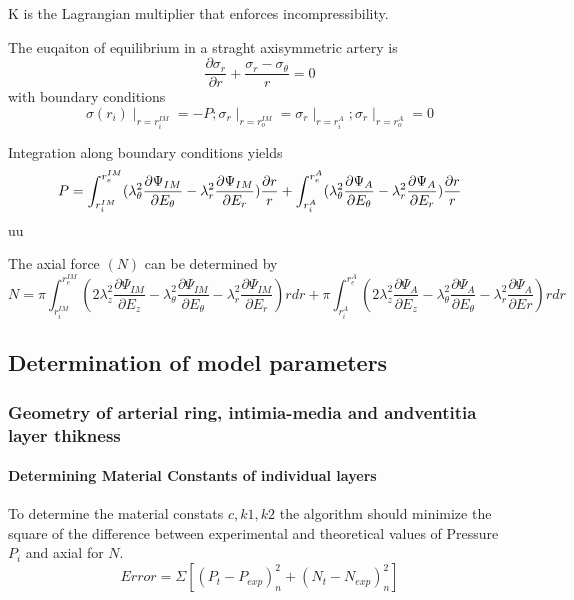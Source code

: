 \documentclass[review]{elsarticle}
\begin{document}
K is the Lagrangian multiplier that enforces incompressibility.

The euqaiton of equilibrium in a straght axisymmetric artery is
\begin{equation}
    \frac{\partial \sigma_r}{\partial r}+\frac{\sigma_r-\sigma_\theta}{r}=0
\end{equation}
with boundary conditions
\begin{equation}
    \sigma(r_i)\mid_{r=r_i^{IM}}=-P;\sigma_r\mid_{r=r_o^{IM}}=\sigma_r\mid_{r=r_i^A};\sigma_r\mid_{r=r_o^A}=0
\end{equation}

Integration along boundary conditions yields
\begin{equation}
    P=\int_{r_{i}^{IM}}^{r_{e}^{IM}}(\lambda_\theta^2 \frac{\partial
    \Psi_{IM}}{\partial E_\theta} - \lambda_r^2 \frac{\partial
    \Psi_{IM}}{\partial E_r}) \frac{\partial r}{r}\\
    +\int_{r_{i}^A}^{r_{e}^A}(\lambda_\theta^2 \frac{\partial \Psi_{A}}{\partial E_\theta} - \lambda_r^2 \frac{\partial \Psi_{A}}{\partial E_r}) \frac{\partial r}{r}
\end{equation}uu

The axial force $(N)$ can be determined by
\begin{equation}
    N=\pi \int_{r_{i}^{IM}}^{r_{e}^{IM}}(2\lambda_z^2 \frac{\partial \Psi_{IM}}{\partial E_z}- \lambda_\theta^2 \frac{\partial \Psi_{IM}}{\partial E_\theta}- \lambda_r^2 \frac{\partial \Psi_{IM}}{\partial E_r})rdr 
    +\pi \int_{r_{i}^A}^{r_{e}^A}(2\lambda_z^2 \frac{\partial \Psi_{A}}{\partial E_z}- \lambda_\theta^2 \frac{\partial \Psi_{A}}{\partial E_\theta}- \lambda_r^2 \frac{\partial \Psi_{A}}{\partial Er})rdr                           
\end{equation}

\subsection{Determination of model parameters}
\subsubsection{Geometry of arterial ring, intimia-media and andventitia layer
thikness}


\paragraph{Determining Material Constants of individual layers} To determine the material constats $c,k1,k2$  the algorithm should minimize the square of the difference between experimental and theoretical values of 
Pressure $P_i$ and axial for $N$.
\begin{equation}
Error = \Sigma[(P_t -P_{exp})_n^2+(N_t-N_{exp})_n^2 ]
\end{equation}

\end{document}
